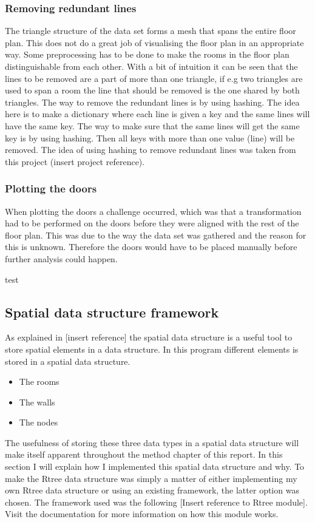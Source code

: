 \subsubsection{Removing redundant lines}
The triangle structure of the data set forms a mesh that spans the entire floor plan. This does not do a great job of visualising the floor plan in an appropriate way. Some preprocessing has to be done to make the rooms in the floor plan distinguishable from each other. With a bit of intuition it can be seen that the lines to be removed are a part of more than one triangle, if e.g two triangles are used to span a room the line that should be removed is the one shared by both triangles. The way to remove the redundant lines is by using hashing. The idea here is to make a dictionary where each line is given a key and the same lines will have the same key. The way to make sure that the same lines will get the same key is by using hashing. Then all keys with more than one value (line) will be removed. The idea of using hashing to remove redundant lines was taken from this project (insert project reference).
\subsubsection{Plotting the doors}
When plotting the doors a challenge occurred, which was that a transformation had to be performed on the doors before they were aligned with the rest of the floor plan. 
This was due to the way the data set was gathered and the reason for this is unknown. 
Therefore the doors would have to be placed manually before further analysis could happen.

test\cite{xu2017bim}



\subsection{Spatial data structure framework}
As explained in [insert reference] the spatial data structure is a useful tool to store spatial elements in a data structure. In this program different elements is stored in a spatial data structure. 
\begin{itemize}
    \item The rooms
    \item The walls
    \item The nodes
\end{itemize}
The usefulness of storing these three data types in a spatial data structure will make itself apparent throughout the method chapter of this report.
In this section I will explain how I implemented this spatial data structure and why.
To make the Rtree data structure was simply a matter of either implementing my own Rtree data structure or using an existing framework, the latter option was chosen.
The framework used was the following [Insert reference to Rtree module]. Visit the documentation for more information on how this module works.

